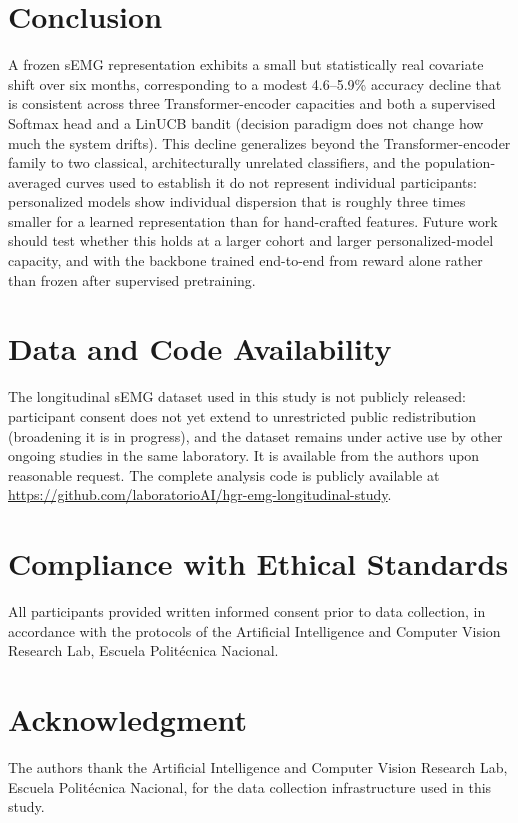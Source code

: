 \documentclass{article}
\begin{document}
\section{Conclusion}
\label{sec:conclusion}

A frozen sEMG representation exhibits a small but statistically real covariate shift over six months, corresponding to a modest 4.6--5.9\% accuracy decline that is consistent across three Transformer-encoder capacities and both a supervised Softmax head and a LinUCB bandit (decision paradigm does not change how much the system drifts). This decline generalizes beyond the Transformer-encoder family to two classical, architecturally unrelated classifiers, and the population-averaged curves used to establish it do not represent individual participants: personalized models show individual dispersion that is roughly three times smaller for a learned representation than for hand-crafted features. Future work should test whether this holds at a larger cohort and larger personalized-model capacity, and with the backbone trained end-to-end from reward alone rather than frozen after supervised pretraining.

\section*{Data and Code Availability}
The longitudinal sEMG dataset used in this study is not publicly released: participant consent does not yet extend to unrestricted public redistribution (broadening it is in progress), and the dataset remains under active use by other ongoing studies in the same laboratory. It is available from the authors upon reasonable request. The complete analysis code is publicly available at \url{https://github.com/laboratorioAI/hgr-emg-longitudinal-study}.

\section*{Compliance with Ethical Standards}
All participants provided written informed consent prior to data collection, in accordance with the protocols of the Artificial Intelligence and Computer Vision Research Lab, Escuela Polit\'ecnica Nacional.

\section*{Acknowledgment}
The authors thank the Artificial Intelligence and Computer Vision Research Lab, Escuela Polit\'ecnica Nacional, for the data collection infrastructure used in this study.



\end{document}
